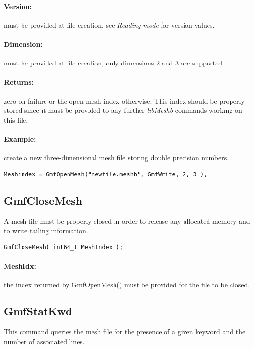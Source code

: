 \documentclass[a4paper,12pt]{article}
\begin{document}
\paragraph{Version:}
must be provided at file creation, see \emph{Reading mode} for version values.

\paragraph{Dimension:}
must be provided at file creation, only dimensions 2 and 3 are supported.

\paragraph{Returns:}
zero on failure or the open mesh index otherwise. This index should be properly stored since it must be provided to any further \emph{libMeshb} commands working on this file.

\paragraph{Example:} create a new three-dimensional mesh file storing double precision numbers.

\begin{tt}
\begin{verbatim}
Meshindex = GmfOpenMesh("newfile.meshb", GmfWrite, 2, 3 );
\end{verbatim}
\end{tt}
\normalfont


\subsection{GmfCloseMesh}
A mesh file must be properly closed in order to release any allocated memory and to write tailing information.

\begin{tt}
\begin{verbatim}
GmfCloseMesh( int64_t MeshIndex );
\end{verbatim}
\end{tt}
\normalfont

\paragraph{MeshIdx:}
the index returned by GmfOpenMesh() must be provided for the file to be closed.


\subsection{GmfStatKwd}
This command queries the mesh file for the presence of a given keyword and the number of associated lines.
\end{document}
